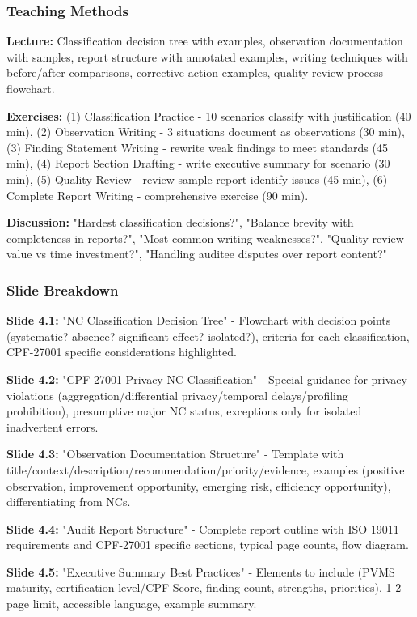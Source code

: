 \documentclass[11pt,a4paper]{article}
\begin{document}
\subsubsection{Teaching Methods}
\textbf{Lecture:} Classification decision tree with examples, observation documentation with samples, report structure with annotated examples, writing techniques with before/after comparisons, corrective action examples, quality review process flowchart.

\textbf{Exercises:} (1) Classification Practice - 10 scenarios classify with justification (40 min), (2) Observation Writing - 3 situations document as observations (30 min), (3) Finding Statement Writing - rewrite weak findings to meet standards (45 min), (4) Report Section Drafting - write executive summary for scenario (30 min), (5) Quality Review - review sample report identify issues (45 min), (6) Complete Report Writing - comprehensive exercise (90 min).

\textbf{Discussion:} "Hardest classification decisions?", "Balance brevity with completeness in reports?", "Most common writing weaknesses?", "Quality review value vs time investment?", "Handling auditee disputes over report content?"

\subsubsection{Slide Breakdown}

\textbf{Slide 4.1:} "NC Classification Decision Tree" - Flowchart with decision points (systematic? absence? significant effect? isolated?), criteria for each classification, CPF-27001 specific considerations highlighted.

\textbf{Slide 4.2:} "CPF-27001 Privacy NC Classification" - Special guidance for privacy violations (aggregation/differential privacy/temporal delays/profiling prohibition), presumptive major NC status, exceptions only for isolated inadvertent errors.

\textbf{Slide 4.3:} "Observation Documentation Structure" - Template with title/context/description/recommendation/priority/evidence, examples (positive observation, improvement opportunity, emerging risk, efficiency opportunity), differentiating from NCs.

\textbf{Slide 4.4:} "Audit Report Structure" - Complete report outline with ISO 19011 requirements and CPF-27001 specific sections, typical page counts, flow diagram.

\textbf{Slide 4.5:} "Executive Summary Best Practices" - Elements to include (PVMS maturity, certification level/CPF Score, finding count, strengths, priorities), 1-2 page limit, accessible language, example summary.
\end{document}
